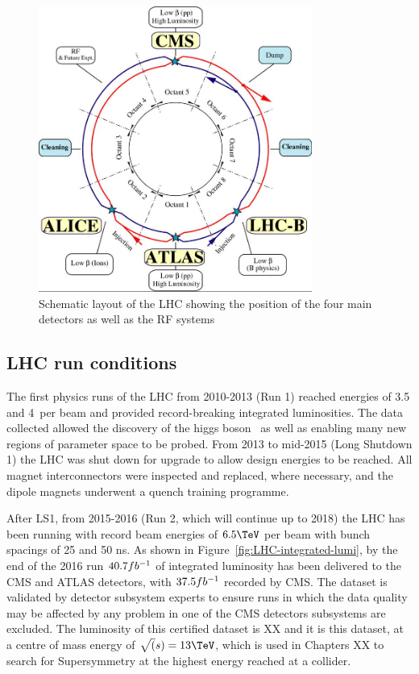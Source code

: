 \begin{figure}
\centering
    \includegraphics[width=0.8\textwidth]{./Figures/detector/lhcDiagram}
  \caption{Schematic layout of the LHC showing the position of the four main detectors as
  well as the RF systems}
  \label{fig:LHC-diagram}
\end{figure}

\subsection{LHC run conditions}

The first physics runs of the LHC from 2010-2013 (Run 1) reached energies of 3.5 and 4\TeV~per beam and 
provided record-breaking integrated luminosities. The data collected allowed the 
discovery of the higgs boson~\cite{higgs} as well as enabling many new regions of parameter space
to be probed. From 2013 to mid-2015 (Long Shutdown 1) the LHC was shut down for upgrade to allow design
energies to be reached. All magnet interconnectors were inspected and replaced, where necessary,
and the dipole magnets underwent a quench training programme. 

After LS1, from 2015-2016 (Run 2, which will continue up to 2018) the LHC has been running with record beam energies 
of $6.5\TeV$ per beam with bunch spacings of 25 and 50 ns. 
As shown in Figure~\ref{fig:LHC-integrated-lumi}, by the end of the 2016 run $40.7fb^{-1}$ of integrated luminosity has been 
delivered to the CMS and ATLAS detectors, with $37.5fb^{-1}$ recorded by CMS. The dataset is validated by detector
subsystem experts to ensure runs in which the data quality may be affected by any problem in one of the CMS detectors 
subsystems are excluded. The luminosity of this certified dataset is XX and it is this dataset, 
at a centre of mass energy of $\sqrt(s) = 13\TeV$, 
which is used in Chapters XX to search for Supersymmetry at the highest energy reached at a collider.

